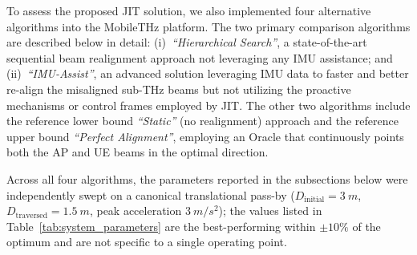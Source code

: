 \documentclass[fleqn,10pt]{wlscirep}
\begin{document}
To assess the proposed JIT solution, we also implemented four alternative algorithms into the MobileTHz platform. The two primary comparison algorithms are described below in detail: (i)~\emph{``Hierarchical Search''}, a state-of-the-art sequential beam realignment approach not leveraging any IMU assistance; and (ii)~\emph{``IMU-Assist''}, an advanced solution leveraging IMU data to faster and better re-align the misaligned sub-THz beams but not utilizing the proactive mechanisms or control frames employed by JIT. The other two algorithms include the reference lower bound \emph{``Static''} (no realignment) approach and the reference upper bound \emph{``Perfect Alignment''}, employing an Oracle that continuously points both the AP and UE beams in the optimal direction.

Across all four algorithms, the parameters reported in the subsections below were independently swept on a canonical translational pass-by ($D_{\text{initial}} = \SI{3}{m}$, $D_{\text{traversed}} = \SI{1.5}{m}$, peak acceleration $\SI{3}{m/s^2}$); the values listed in Table~\ref{tab:system_parameters} are the best-performing within $\pm 10\%$ of the optimum and are not specific to a single operating point.



\end{document}
